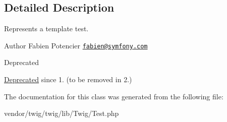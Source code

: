 \subsection{Detailed Description}
Represents a template test.

\begin{DoxyAuthor}{Author}
Fabien Potencier \href{mailto:fabien@symfony.com}{\tt fabien@symfony.\+com}
\end{DoxyAuthor}
\begin{DoxyRefDesc}{Deprecated}
\item[\hyperlink{deprecated__deprecated000040}{Deprecated}]since 1. (to be removed in 2.) \end{DoxyRefDesc}


The documentation for this class was generated from the following file\+:\begin{DoxyCompactItemize}
\item 
vendor/twig/twig/lib/\+Twig/Test.\+php\end{DoxyCompactItemize}
